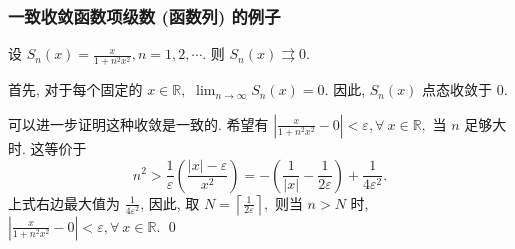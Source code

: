 
\begin{frame}
\frametitle{一致收敛函数项级数 (函数列) 的例子}

\begin{eg}
\begin{center}
设 $S_n(x) = \frac{x}{1 + n^2 x^2}, n = 1, 2, \cdots.$ 则 $S_n(x) \rightrightarrows 0.$
\end{center}
\end{eg}

\pause
\vspace{0.5em}

\startproof[bg=yellow, fg=red]
首先, 对于每个固定的 $x \in \mathbb{R},$ $\lim_{n \to \infty} S_n(x) = 0.$ 因此, $S_n(x)$ 点态收敛于 $0.$

\pause

可以进一步证明这种收敛是\alert{一致}的. 希望有 $\left| \frac{x}{1 + n^2 x^2} - 0 \right| < \varepsilon, \forall ~ x \in \mathbb{R},$ 当 $n$ 足够大时. 这等价于
\[
n^2 > \frac{1}{\varepsilon} \left( \frac{|x| - \varepsilon}{x^2} \right) = - \left( \frac{1}{|x|} - \frac{1}{2\varepsilon} \right) + \frac{1}{4\varepsilon^2}.
\]
上式右边最大值为 $\frac{1}{4\varepsilon^2}$, 因此, 取 $N = \left\lceil \frac{1}{2\varepsilon} \right\rceil,$ 则当 $n > N$ 时, $\left| \frac{x}{1 + n^2 x^2} - 0 \right| < \varepsilon, \forall ~ x \in \mathbb{R}.$
\qed

\end{frame}


